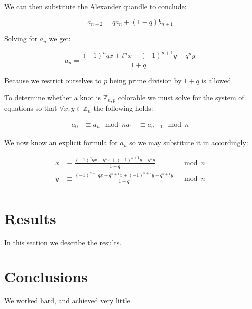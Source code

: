 \documentclass[12pt]{article}
\begin{document}
We can then substitute the Alexander quandle to conclude:

$$ a_{n+2} = qa_{n} + (1-q)b_{n+1} $$

Solving for $a_n$ we get:

$$ a_n = \frac{(-1)^nqx+t^nx+(-1)^{n+1}y+q^ny}{1+q} $$

Because we restrict ourselves to $p$ being prime division by $1+q$ is allowed.

To determine whether a knot is $\mathbb{Z}_{n,p}$ colorable we must solve for the system of equations so that $\forall x,y \in \mathbb{Z}_n$ the following holds:

\begin{align*}
	a_0 &\equiv a_{n}  \mod{n}
	a_1 &\equiv a_{n+1} \mod{n}
\end{align*}

We now know an explicit formula for $a_n$ so we may substitute it in accordingly:

\begin{align*}
	x &\equiv \frac{(-1)^nqx+q^nx+(-1)^{n+1}y+q^ny}{1+q} & \mod{n} \\
	y &\equiv \frac{(-1)^{n+1}qx+q^{n+1}x+(-1)^{n+2}y+q^{n+1}y}{1+q} & \mod{n} \\
\end{align*}

\section{Results}\label{results}
In this section we describe the results.

\section{Conclusions}\label{conclusions}
We worked hard, and achieved very little.



\end{document}
